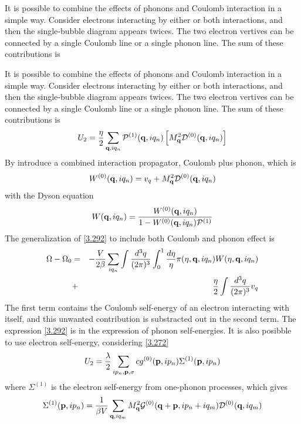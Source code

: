 It is possible to combine the effects of phonons and Coulomb interaction in a simple way.
Consider electrons interacting by either or both interactions, and then the single-bubble diagram appears twices.
The two electron vertives can be connected by a single Coulomb line or a single phonon line. The sum of these contributions is

It is possible to combine the effects of phonons and Coulomb interaction in a simple way.
Consider electrons interacting by either or both interactions, and then the single-bubble diagram appears twices.
The two electron vertives can be connected by a single Coulomb line or a single phonon line. The sum of these contributions is
\begin{equation}
    U_2 = \frac{\eta}{2} \sum_{\mathbf{q},iq_n} \mathcal{P}^{(1)}(\mathbf{q},iq_n) \left[ M_{\mathbf{q}}^2 \mathcal{D}^{(0)}(\mathbf{q},iq_n)\right] \label{3.293}
\end{equation}
By introduce a combined interaction propagator, Coulomb plus phonon, which is
\begin{equation}
    W^{(0)} (\mathbf{q},iq_n) = v_q + M_{\mathbf{q}}^2 \mathcal{D}^{(0)}(\mathbf{q},iq_n)  \label{3.295}
\end{equation}
with the Dyson equation
\begin{equation}
    W(\mathbf{q},iq_n) = \frac{W^{(0)}(\mathbf{q},iq_n)}{1-W^{(0)}(\mathbf{q},iq_n)\mathcal{P}^{(1)}}     \label{3.296}
\end{equation}
The generalization of \eqref{3.292} to include both Coulomb and phonon effect is
\begin{eqnarray}
    \Omega- \Omega_0 &=& - \frac{V}{2\beta} \sum_{iq_n} \int \frac{d^3 q}{(2\pi)^3} \int_0^1 \frac{d\eta}{\eta} \pi(\eta,\mathbf{q},iq_n) W(\eta,\mathbf{q},iq_n) \nonumber\\
    &+& \frac{\eta}{2} \int \frac{d^3q}{(2\pi)^3} v_q \label{3.297}
\end{eqnarray}
The first term contains the Coulomb self-energy of an electron interacting with itself, and this unwanted contribution is substracted out in the second term.
The expression \eqref{3.292} is in the expression of phonon self-energies.
It is also posibble to use electron self-energy, considering \eqref{3.272}
\begin{equation}
    U_2 = \frac{\lambda}{2} \sum_{ip_n,\mathbf{p},\sigma} cg^{(0)}(\mathbf{p},ip_n) \Sigma^{(1)}(\mathbf{p},ip_n)    \label{3.298}
\end{equation}
where $\Sigma^{(1)}$ is the electron self-energy from one-phonon processes, which gives
\begin{equation}
    \Sigma^{(1)}(\mathbf{p},ip_n) = \frac{1}{\beta V} \sum_{\mathbf{q},iq_m} M^2_{\mathbf{q}} \mathcal{G}^{(0)}(\mathbf{q}+\mathbf{p},ip_n+iq_m) \mathcal{D}^{(0)}(\mathbf{q},iq_m)
\end{equation}

